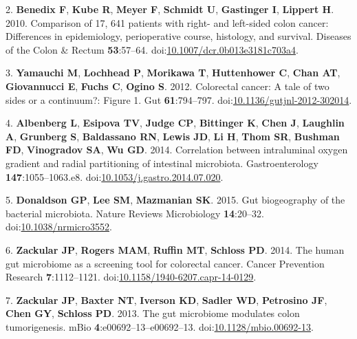 \documentclass[11pt,]{article}
\begin{document}
\hypertarget{ref-Benedix2010}{}
2. \textbf{Benedix F}, \textbf{Kube R}, \textbf{Meyer F},
\textbf{Schmidt U}, \textbf{Gastinger I}, \textbf{Lippert H}. 2010.
Comparison of 17, 641 patients with right- and left-sided colon cancer:
Differences in epidemiology, perioperative course, histology, and
survival. Diseases of the Colon \& Rectum \textbf{53}:57--64.
doi:\href{https://doi.org/10.1007/dcr.0b013e3181c703a4}{10.1007/dcr.0b013e3181c703a4}.

\hypertarget{ref-Yamauchi2012}{}
3. \textbf{Yamauchi M}, \textbf{Lochhead P}, \textbf{Morikawa T},
\textbf{Huttenhower C}, \textbf{Chan AT}, \textbf{Giovannucci E},
\textbf{Fuchs C}, \textbf{Ogino S}. 2012. Colorectal cancer: A tale of
two sides or a continuum?: Figure 1. Gut \textbf{61}:794--797.
doi:\href{https://doi.org/10.1136/gutjnl-2012-302014}{10.1136/gutjnl-2012-302014}.

\hypertarget{ref-Albenberg2014}{}
4. \textbf{Albenberg L}, \textbf{Esipova TV}, \textbf{Judge CP},
\textbf{Bittinger K}, \textbf{Chen J}, \textbf{Laughlin A},
\textbf{Grunberg S}, \textbf{Baldassano RN}, \textbf{Lewis JD},
\textbf{Li H}, \textbf{Thom SR}, \textbf{Bushman FD}, \textbf{Vinogradov
SA}, \textbf{Wu GD}. 2014. Correlation between intraluminal oxygen
gradient and radial partitioning of intestinal microbiota.
Gastroenterology \textbf{147}:1055--1063.e8.
doi:\href{https://doi.org/10.1053/j.gastro.2014.07.020}{10.1053/j.gastro.2014.07.020}.

\hypertarget{ref-Donaldson2015}{}
5. \textbf{Donaldson GP}, \textbf{Lee SM}, \textbf{Mazmanian SK}. 2015.
Gut biogeography of the bacterial microbiota. Nature Reviews
Microbiology \textbf{14}:20--32.
doi:\href{https://doi.org/10.1038/nrmicro3552}{10.1038/nrmicro3552}.

\hypertarget{ref-Zackular2014}{}
6. \textbf{Zackular JP}, \textbf{Rogers MAM}, \textbf{Ruffin MT},
\textbf{Schloss PD}. 2014. The human gut microbiome as a screening tool
for colorectal cancer. Cancer Prevention Research \textbf{7}:1112--1121.
doi:\href{https://doi.org/10.1158/1940-6207.capr-14-0129}{10.1158/1940-6207.capr-14-0129}.

\hypertarget{ref-Zackular2013}{}
7. \textbf{Zackular JP}, \textbf{Baxter NT}, \textbf{Iverson KD},
\textbf{Sadler WD}, \textbf{Petrosino JF}, \textbf{Chen GY},
\textbf{Schloss PD}. 2013. The gut microbiome modulates colon
tumorigenesis. mBio \textbf{4}:e00692--13--e00692--13.
doi:\href{https://doi.org/10.1128/mbio.00692-13}{10.1128/mbio.00692-13}.
\end{document}
